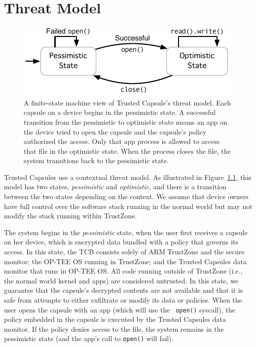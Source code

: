 \chapter{Threat Model}
\label{ch:ThreatModel}

\begin{figure}
  \centering
  \includegraphics[width=\columnwidth]{fig/state-machine.pdf}
  \caption{A finite-state machine view of Trusted Capsule's threat model. Each
    capsule on a device begins in the pessimistic state. A successful transition
    from the pessimistic to optimistic state means an app on the device tried to
    open the capsule and the capsule's policy authorized the access. Only that
    app process is allowed to access that file in the optimistic state. When the
    process closes the file, the system transitions back to the pessimistic
    state.}
  \label{fig:threatmodelstatediag}
\end{figure}

Trusted Capsules use a contextual threat model. As illustrated in
Figure~\ref{fig:threatmodelstatediag}, this model has two states, {\em
  pessimistic} and {\em optimistic}, and there is a transition between
the two states depending on the context. We assume that device owners
have full control over the software stack running in the normal world
but may not modify the stack running within TrustZone.

The system begins in the {\em pessimistic} state, when the user first receives a
capsule on her device, which is encrypted data bundled with a policy that
governs its access. In this state, the TCB consists solely of ARM TrustZone and
the secure monitor; the OP-TEE OS running in TrustZone; and the Trusted Capsules
data monitor that runs in OP-TEE OS. All code running outside of TrustZone
(i.e., the normal world kernel and apps) are considered untrusted. In this
state, we guarantee that the capsule's decrypted contents are not available and
that it is safe from attempts to either exfiltrate or modify its data or
policies. When the user opens the capsule with an app (which will use the {\tt
  open()} syscall), the policy embedded in the capsule is executed by the
Trusted Capsules data monitor. If the policy denies access to the file, the
system remains in the pessimistic state (and the app's call to {\tt open()} will
fail).

